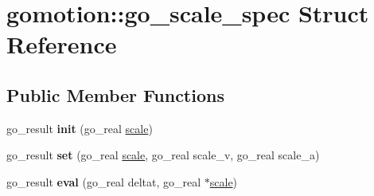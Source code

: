 \hypertarget{structgomotion_1_1go__scale__spec}{\section{gomotion\-:\-:go\-\_\-scale\-\_\-spec Struct Reference}
\label{structgomotion_1_1go__scale__spec}
}
\subsection*{Public Member Functions}
\begin{DoxyCompactItemize}
\item 
\hypertarget{structgomotion_1_1go__scale__spec_ab10fecb573317c67528eb4d370705129}{go\-\_\-result {\bfseries init} (go\-\_\-real \hyperlink{structgomotion_1_1go__scale__spec_a592f5bd1c5d775d30e25b798900a2c30}{scale})}\label{structgomotion_1_1go__scale__spec_ab10fecb573317c67528eb4d370705129}

\item 
\hypertarget{structgomotion_1_1go__scale__spec_af98067c5057e4a27be45c932d40b1ee3}{go\-\_\-result {\bfseries set} (go\-\_\-real \hyperlink{structgomotion_1_1go__scale__spec_a592f5bd1c5d775d30e25b798900a2c30}{scale}, go\-\_\-real scale\-\_\-v, go\-\_\-real scale\-\_\-a)}\label{structgomotion_1_1go__scale__spec_af98067c5057e4a27be45c932d40b1ee3}

\item 
\hypertarget{structgomotion_1_1go__scale__spec_a8eaf5f40d5b5ee430ae70a1f4fbcff1e}{go\-\_\-result {\bfseries eval} (go\-\_\-real deltat, go\-\_\-real $\ast$\hyperlink{structgomotion_1_1go__scale__spec_a592f5bd1c5d775d30e25b798900a2c30}{scale})}\label{structgomotion_1_1go__scale__spec_a8eaf5f40d5b5ee430ae70a1f4fbcff1e}

\end{DoxyCompactItemize}
